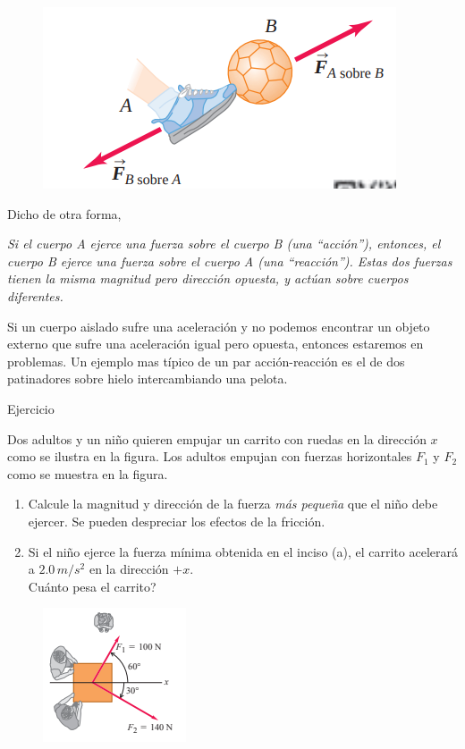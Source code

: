 \begin{frame}

    \begin{figure}
        \centering
        \includegraphics[width=0.5\linewidth]{figures/ac-reac.png}
    \end{figure}

    Dicho de otra forma, \begin{center}
    \textit{Si el cuerpo A ejerce una fuerza sobre
el cuerpo B (una “acción”), entonces, el cuerpo B ejerce una fuerza sobre el cuerpo A
(una “reacción”). Estas dos fuerzas tienen la misma magnitud pero dirección opuesta,
y actúan sobre cuerpos diferentes.}
\end{center}

    Si un cuerpo aislado sufre una aceleraci\'on y no podemos encontrar un objeto externo que sufre una aceleraci\'on igual pero opuesta, entonces estaremos en problemas. Un ejemplo mas típico de un par acción-reacción es el de dos patinadores sobre hielo intercambiando una pelota.
\end{frame}

\begin{frame}{Ejercicio}

Dos adultos y un ni\~no quieren empujar un carrito con ruedas en la direcci\'on $x$ como se ilustra en la figura. 
Los adultos empujan con fuerzas horizontales $F_1$ y $F_2$ como se muestra en la figura. 

\begin{enumerate}
    \item[(a)] Calcule la magnitud y direcci\'on de la fuerza \textit{m\'as peque\~na} que el ni\~no debe ejercer. Se pueden despreciar los efectos de la fricci\'on.
    \item[(b)] Si el ni\~no ejerce la fuerza m\'inima obtenida en el inciso (a), el carrito acelerar\'a a $2.0\,\unit{m/s^2}$ en la direcci\'on $+x$. \\
    \textquestiondown Cu\'anto pesa el carrito?
\end{enumerate}

\begin{figure}
    \centering
    \includegraphics[width=0.3\linewidth]{figures/p1newton.png}
\end{figure}
    
\end{frame}

